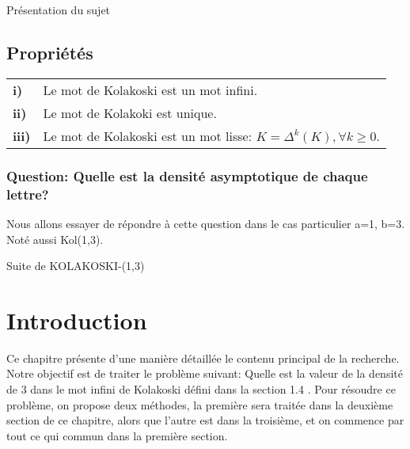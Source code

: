 \documentclass[12pt,a4paper,oneside]{book}
\begin{document}
\begin{titlepage}
\begin{chapter}{Présentation du sujet}
\subsection{Propriétés}
\begin{tabular}{ll}
\textbf{i)}   & Le mot de Kolakoski est un mot infini.\\
\textbf{ii)} & Le mot de Kolakoki est unique.\\
\textbf{iii)} & Le mot de Kolakoski est un mot lisse: $K=\Delta^k(K), \forall k \geq 0$.
\end{tabular}
\subsubsection*{Question: Quelle est la densité asymptotique de chaque lettre?}
Nous allons essayer de répondre à cette question dans le cas particulier a=1, b=3. Noté aussi Kol(1,3).
\end{chapter}
\begin{chapter}{Suite de KOLAKOSKI-(1,3)}
\section*{Introduction}
\par Ce chapitre présente d'une manière détaillée le contenu principal de la recherche. Notre objectif est de traiter le problème suivant: Quelle est la valeur de la densité de 3 dans le mot infini de Kolakoski défini dans la section 1.4 . Pour résoudre ce problème, on propose deux méthodes, la première sera traitée dans la deuxième section de ce chapitre, alors que l'autre est dans la troisième, et on commence par tout ce qui commun dans la première section.

\end{chapter}
\end{titlepage}
\end{document}
